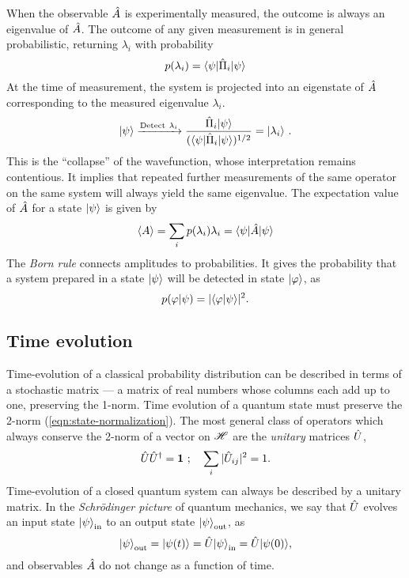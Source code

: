 When the observable $\hat{A}$ is experimentally measured, the outcome is always an eigenvalue of $\hat{A}$. The outcome of any given measurement is in general probabilistic, returning $\lambda_i$ with probability
\begin{equation}
   p(\lambda_i) = \mbox{$ \langle \psi | $}\hat{\Pi}_i\mbox{$ | \psi \rangle $} 
\end{equation}
At the time of measurement, the system is projected into an eigenstate of $\hat{A}$ corresponding to the measured eigenvalue $\lambda_i$. 
\begin{equation}
    \mbox{$ | \psi \rangle $} \xrightarrow{\text{Detect}~\lambda_i} \frac{\hat{\Pi}_i\mbox{$ | \psi \rangle $}}{(\mbox{$ \langle \psi | $}\hat{\Pi}_i\mbox{$ | \psi \rangle $})^{1/2}} = \mbox{$ | \lambda_i \rangle $}~.
\end{equation}
This is the ``collapse'' of the wavefunction, whose interpretation remains contentious. It implies that repeated further measurements of the same operator on the same system will always yield the same eigenvalue.
The expectation value of $\hat{A}$ for a state $\mbox{$ | \psi \rangle $}$ is given by
\begin{equation}
\langle A \rangle = \sum_i p(\lambda_i) \lambda_i = \mbox{$ \langle \psi | $} \hat{A} \mbox{$ | \psi \rangle $}
\end{equation}
The \emph{Born rule} connects amplitudes to probabilities. It gives the probability that a system prepared in a state $\mbox{$ | \psi \rangle $}$ will be detected in state $\mbox{$ | \varphi \rangle $}$, as
\begin{equation}
    p(\varphi | \psi) = |\langle \varphi | \psi \rangle|^2.
\end{equation}

\subsection{Time evolution}
\label{sec:time-evolution}
Time-evolution of a classical probability distribution can be described in terms of a stochastic matrix --- a matrix of real numbers whose columns each add up to one, preserving the 1-norm.
Time evolution of a quantum state must preserve the 2-norm (\ref{eqn:state-normalization}). The most general class of operators which always conserve the 2-norm of a vector on $\mathscr{H}$ are the \emph{unitary} matrices $\hat{U}$, 
\begin{equation}
    \hat{U} \hat{U}^\dagger = \mathbf{1}~;\quad
    \sum_i |\hat{U}_{ij}|^2 = 1
    .
\end{equation}
Time-evolution of a closed quantum system can always be described by a unitary matrix.
In the \emph{Schr\"odinger picture} of quantum mechanics, we say that $\hat{U}$ evolves an input state $\mbox{$ | \psi \rangle $}_{\mathrm{in}}$ to an output state $\mbox{$ | \psi \rangle $}_{\mathrm{out}}$, as
\begin{equation}
    \mbox{$ | \psi \rangle $}_{\mathrm{out}}  = \mbox{$ | \psi(t) \rangle $} = \hat{U} \mbox{$ | \psi \rangle $}_{\mathrm{in}} = \hat{U} \mbox{$ | \psi(0) \rangle $},
\end{equation}
and observables $\hat{A}$ do not change as a function of time. 

